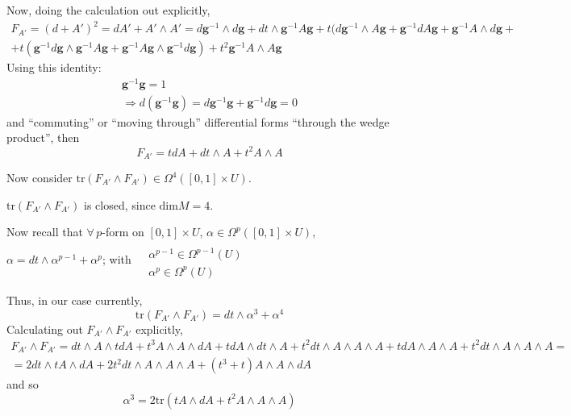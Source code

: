 \documentclass[10pt]{amsart}
\begin{document}
\begin{multicols}{2}
Now, doing the calculation out explicitly,
\[
\begin{gathered}
F_{A'} = (d+A')^2 = dA' + A'\wedge A' = d\mathbf{g}^{-1} \wedge d\mathbf{g} + dt \wedge \mathbf{g}^{-1} A \mathbf{g} + t(d\mathbf{g}^{-1} \wedge A \mathbf{g} + \mathbf{g}^{-1} dA \mathbf{g} + \mathbf{g}^{-1} A \wedge d\mathbf{g} + \\
 + t(\mathbf{g}^{-1} d\mathbf{g} \wedge \mathbf{g}^{-1} A \mathbf{g} + \mathbf{g}^{-1} A \mathbf{g} \wedge \mathbf{g}^{-1} d\mathbf{g} ) + t^2 \mathbf{g}^{-1} A \wedge A \mathbf{g}
\end{gathered}
\]
Using this identity:
\[
\begin{gathered}
  \mathbf{g}^{-1} \mathbf{g} = 1 \\ 
  \Longrightarrow d( \mathbf{g}^{-1} \mathbf{g} ) = d\mathbf{g}^{-1} \mathbf{g} + \mathbf{g}^{-1} d\mathbf{g} = 0 
\end{gathered}
\]
and ``commuting'' or ``moving through'' differential forms ``through the wedge product'', then
\[
F_{A'} = tdA + dt \wedge A + t^2 A \wedge A
\]

Now consider $\text{tr}(F_{A'} \wedge F_{A'} ) \in \Omega^4([0,1]\times U)$.  

$\text{tr}(F_{A'} \wedge F_{A'})$ is closed, since $\text{dim}M = 4$.  

Now recall that $\forall \, p$-form on $[0,1] \times U$, $\alpha \in \Omega^p([0,1]\times U)$, $\alpha = dt \wedge \alpha^{p-1} + \alpha^p$; with $\begin{aligned} & \quad \\ 
  & \alpha^{p-1} \in \Omega^{p-1}(U) \\
  & \alpha^p \in \Omega^p(U) \end{aligned}$

Thus, in our case currently, 
\[
\text{tr}(F_{A'} \wedge F_{A'}) = dt \wedge \alpha^3 + \alpha^4
\]
Calculating out $F_{A'} \wedge F_{A'}$ explicitly,
\[
\begin{gathered}
  F_{A'} \wedge F_{A'} = dt \wedge A \wedge tdA + t^3 A \wedge A \wedge dA + tdA \wedge dt \wedge A + t^2 dt \wedge A \wedge A \wedge A + tdA \wedge A \wedge A + t^2 dt \wedge A \wedge A \wedge A =  \\
   = 2dt \wedge tA \wedge dA + 2 t^2 dt \wedge A \wedge A \wedge A + (t^3 + t) A\wedge A \wedge dA
\end{gathered}
\]
and so 
\[
\alpha^3 = 2\text{tr}(tA \wedge dA + t^2 A \wedge A \wedge A)
\]


\end{multicols}
\end{document}
